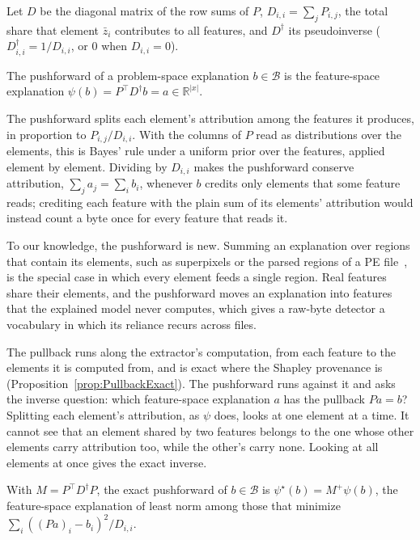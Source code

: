 Let $D$ be the diagonal matrix of the row sums of $P$, $D_{i,i} = \sum_j P_{i,j}$, the total share that element
$\bar{z}_i$ contributes to all features, and $D^\dagger$ its pseudoinverse ($D^\dagger_{i,i} = 1 / D_{i,i}$, or $0$
when $D_{i,i} = 0$).

\label{def:Pushforward}
{
The pushforward of a problem-space explanation $b \in \mathcal{B}$ is the feature-space explanation
$\psi(b) = P^\top D^\dagger b = a \in \mathbb{R}^{|x|}$.
}

The pushforward splits each element's attribution among the features it produces, in proportion to
$P_{i,j} / D_{i,i}$. With the columns of $P$ read as distributions over the elements, this is Bayes' rule under a
uniform prior over the features, applied element by element. Dividing by $D_{i,i}$ makes the pushforward conserve
attribution, $\sum_j a_j = \sum_i b_i$, whenever $b$ credits only elements that some feature reads; crediting each
feature with the plain sum of its elements' attribution would instead count a byte once for every feature that reads
it.

To our knowledge, the pushforward is new. Summing an explanation over regions that contain its elements, such as
superpixels or the parsed regions of a PE file~\cite{coull2019activation, bose2020explaining}, is the special case in
which every element feeds a single region. Real features share their elements, and the pushforward moves an
explanation into features that the explained model never computes, which gives a raw-byte detector a vocabulary in
which its reliance recurs across files.

The pullback runs along the extractor's computation, from each feature to the elements it is computed from, and is
exact where the Shapley provenance is (Proposition~\ref{prop:PullbackExact}). The pushforward runs against it and asks
the inverse question: which feature-space explanation $a$ has the pullback $Pa = b$? Splitting each element's
attribution, as $\psi$ does, looks at one element at a time. It cannot see that an element shared by two features
belongs to the one whose other elements carry attribution too, while the other's carry none. Looking at all elements at
once gives the exact inverse.

\label{def:ExactPushforward}
{
With $M = P^\top D^\dagger P$, the exact pushforward of $b \in \mathcal{B}$ is $\psi^\star(b) = M^{+} \psi(b)$, the
feature-space explanation of least norm among those that minimize $\sum_i ((Pa)_i - b_i)^2 / D_{i,i}$.
}

